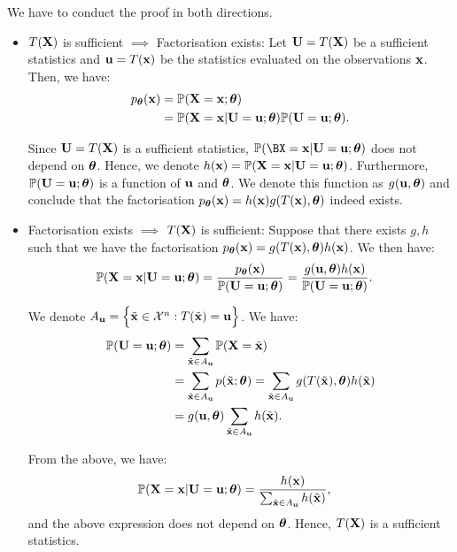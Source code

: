 \begin{proof*}
    We have to conduct the proof in both directions.
    \begin{itemize}
        \item $T({\bf X})$ is sufficient $\implies$ Factorisation exists:
        Let ${\bf U}=T({\bf X})$ be a sufficient statistics and ${\bf u} = T({\bf x})$ be the statistics evaluated on the observations ${\bf x}$. Then, we have:
        \begin{align*}
            p_{\boldsymbol{\theta}}({\bf x}) &= \mathbb{P}({\bf X}={\bf x}; \boldsymbol{\theta}) \\ 
                &= \mathbb{P}({\bf X}={\bf x} | {\bf U}={\bf u}; \boldsymbol{\theta}) \mathbb{P}({\bf U}={\bf u};\boldsymbol{\theta}).
        \end{align*} 

        \noindent Since ${\bf U}=T({\bf X})$ is a sufficient statistics, $\Pm(\BX=\bx|\bU=\bu;\btheta)$ does not depend on $\boldsymbol{\theta}$. Hence, we denote $h({\bf x}) = \mathbb{P}({\bf X}={\bf x}|{\bf U}={\bf u};\boldsymbol{\theta})$. Furthermore, $\mathbb{P}({\bf U}={\bf u};\boldsymbol{\theta})$ is a function of ${\bf u}$ and $\boldsymbol{\theta}$. We denote this function as $g({\bf u}, \boldsymbol{\theta})$ and conclude that the factorisation $p_{\boldsymbol{\theta}}({\bf x})=h({\bf x})g(T({\bf x}),\boldsymbol{\theta})$ indeed exists. 

        \item Factorisation exists $\implies$ $T({\bf X})$ is sufficient: Suppose that there exists $g, h$ such that we have the factorisation $p_{\boldsymbol{\theta}}({\bf x})=g(T({\bf x}), \boldsymbol{\theta})h({\bf x})$. We then have:
        \begin{align*}
            \mathbb{P}({\bf X} = {\bf x}|{\bf U} = {\bf u};\boldsymbol{\theta}) &=  \frac{p_{\boldsymbol{\theta}}({\bf x})}{\mathbb{P}({\bf U}={\bf u};\boldsymbol{\theta})} = \frac{g({\bf u}, \boldsymbol{\theta})h({\bf x})}{\mathbb{P}({\bf U}={\bf u};\boldsymbol{\theta})}.
        \end{align*} 

        \noindent We denote $A_{\bf u} = \Big\{ \tilde{{\bf x}} \in \mathcal{X}^n : T(\tilde{{\bf x}}) = {\bf u} \Big\}$. We have:
        \begin{align*}
            \mathbb{P}({\bf U} = {\bf u};\boldsymbol{\theta}) &= \sum_{\tilde {{\bf x}} \in A_{\bf u}} \mathbb{P}({\bf X} = \tilde{{\bf x}}) \\ 
                &= \sum_{\tilde{{\bf x}}\in A_{\bf u}} p(\tilde{{\bf x}};\boldsymbol{\theta}) = \sum_{\tilde{{\bf x}}\in A_{\bf u}} g(T(\tilde{{\bf x}}), \boldsymbol{\theta})h(\tilde{{\bf x}}) \\ 
                &= g({\bf u}, \boldsymbol{\theta}) \sum_{\tilde{{\bf x}}\in A_{\bf u}} h(\tilde{{\bf x}}).
        \end{align*} 

        \noindent From the above, we have:
        \begin{align*}
            \mathbb{P}({\bf X}={\bf x}|{\bf U}={\bf u};\boldsymbol{\theta}) &= \frac{h({\bf x})}{\sum_{\tilde{{\bf x}}\in A_{\bf u}} h(\tilde{{\bf x}})},
        \end{align*} 
        \noindent and the above expression does not depend on $\boldsymbol{\theta}$. Hence, $T({\bf X})$ is a sufficient statistics.
    \end{itemize}


\end{proof*}
